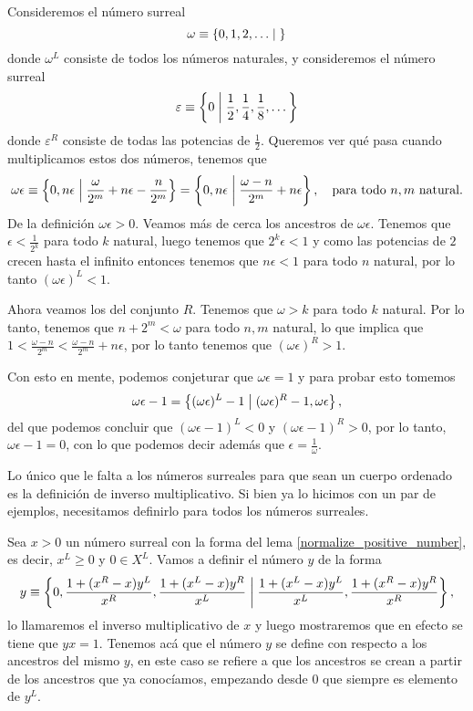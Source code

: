     \begin{example}
        Consideremos el n\'umero surreal
        \[
            \omega \equiv \left\{0,1,2,\dots\;\middle|\; \right\}
        \]
        donde $\omega^L$ consiste de todos los n\'umeros naturales, y consideremos el n\'umero surreal
        \[
            \varepsilon \equiv \left\{0\;\middle|\; \frac{1}{2}, \frac{1}{4}, \frac{1}{8}, \dots\right\}
        \]
        donde $\varepsilon^R$ consiste de todas las potencias de $\frac{1}{2}$. Queremos ver qu\'e pasa cuando multiplicamos estos dos n\'umeros, tenemos que 
        \[
            \omega\epsilon \equiv \left\{0,n\epsilon\;\middle|\; \frac{\omega}{2^m} + n\epsilon - \frac{n}{2^m}\right\} = \left\{0,n\epsilon\;\middle|\; \frac{\omega - n}{2^m} + n\epsilon\right\},\quad\text{para todo $n,m$ natural}.
        \]
        De la definici\'on $\omega\epsilon  > 0$. Veamos m\'as de cerca los ancestros de $\omega\epsilon$. Tenemos que $\epsilon < \frac{1}{2^k}$ para todo $k$ natural, luego tenemos que $2^k\epsilon < 1$ y como las potencias de $2$ crecen hasta el infinito entonces tenemos que $n\epsilon < 1$ para todo $n$ natural, por lo tanto $(\omega\epsilon)^L < 1$.

        Ahora veamos los del conjunto $R$. Tenemos que $\omega > k$ para todo $k$ natural. Por lo tanto, tenemos que $n + 2^m < \omega$ para todo $n,m$ natural, lo que implica que $1 < \frac{\omega - n}{2^m} < \frac{\omega - n}{2^m} + n\epsilon$, por lo tanto tenemos que $(\omega\epsilon)^R > 1$.
        
        Con esto en mente, podemos conjeturar que $\omega\epsilon = 1$ y para probar esto tomemos
        \[
            \omega\epsilon - 1 = \left\{(\omega\epsilon)^L - 1\;\middle|\; (\omega\epsilon)^R - 1, \omega\epsilon\right\},
        \]
        del que podemos concluir que $(\omega\epsilon - 1)^L < 0$ y $(\omega\epsilon - 1)^R > 0$, por lo tanto, $\omega\epsilon - 1 = 0$, con lo que podemos decir adem\'as que $\epsilon = \frac{1}{\omega}$.
    \end{example}

    Lo \'unico que le falta a los n\'umeros surreales para que sean un cuerpo ordenado es la definici\'on de inverso multiplicativo. Si bien ya lo hicimos con un par de ejemplos, necesitamos definirlo para todos los n\'umeros surreales.

    \begin{definition}
        Sea $x > 0$ un n\'umero surreal con la forma del lema \ref{normalize_positive_number}, es decir, $x^L \ge 0$ y $0\in X^L$. Vamos a definir el n\'umero $y$ de la forma
        \[
            y \equiv \left\{0, \frac{1+(x^R-x)y^L}{x^R}, \frac{1+(x^L-x)y^R}{x^L}\;\middle|\; \frac{1+(x^L-x)y^L}{x^L}, \frac{1+(x^R-x)y^R}{x^R}\right\},
        \]
        lo llamaremos el inverso multiplicativo de $x$ y luego mostraremos que en efecto se tiene que $yx=1$. Tenemos ac\'a que el n\'umero $y$ se define con respecto a los ancestros del mismo $y$, en este caso se refiere a que los ancestros se crean a partir de los ancestros que ya conoc\'iamos, empezando desde $0$ que siempre es elemento de $y^L$.
    \end{definition}

